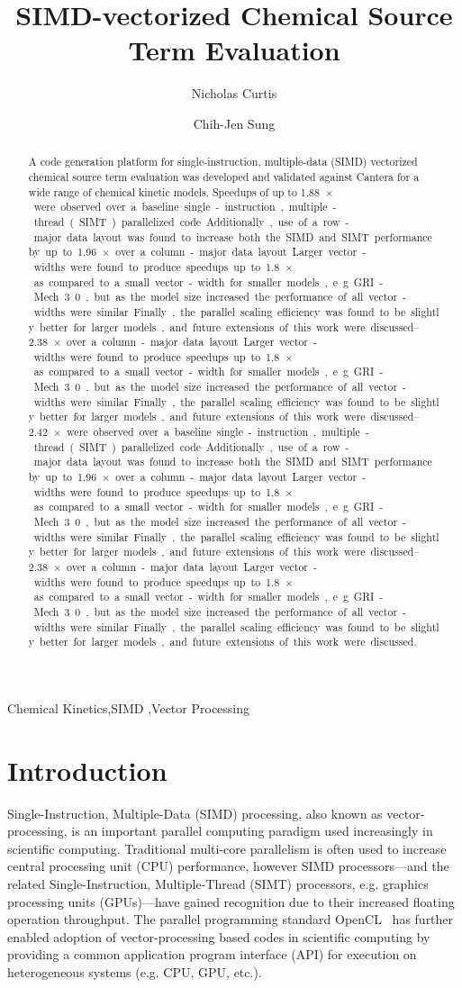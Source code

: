 \documentclass[12pt]{ussci}
\title{SIMD-vectorized Chemical Source Term Evaluation}
\author[*]{Nicholas Curtis}
\author[ ]{Chih-Jen Sung}
\affil[ ]{Department of Mechanical Engineering, University of Connecticut, Storrs, CT 06269, USA}
\affil[*]{Corresponding author: \email{nicholas.curtis@uconn.edu}}
\begin{document}
\maketitle

\begin{abstract} %
A code generation platform for single-instruction, multiple-data (SIMD) vectorized chemical source term evaluation was developed and validated against Cantera for a wide range of chemical kinetic models.
Speedups of up to \SIrange{1.88}{2.42}{$\times$} were observed over a baseline single-instruction, multiple-thread (SIMT) parallelized code.
Additionally, use of a row-major data layout was found to increase both the SIMD and SIMT performance by up to \SIrange{1.96}{2.38}{$\times$} over a column-major data layout.
Larger vector-widths were found to produce speedups up to \SI{1.8}{$\times$} as compared to a small vector-width for smaller models, e.g. GRI-Mech 3.0, but as the model size increased the performance of all vector-widths were similar.
Finally, the parallel scaling efficiency was found to be slightly better for larger models, and future extensions of this work were discussed.
\end{abstract}

\begin{keyword}
    Chemical Kinetics\sep SIMD \sep Vector Processing
\end{keyword}

\section{Introduction}
%

Single-Instruction, Multiple-Data (SIMD) processing, also known as vector-processing, is an important parallel computing paradigm used increasingly in scientific computing.
Traditional multi-core parallelism is often used to increase central processing unit (CPU) performance, however SIMD processors---and the related Single-Instruction, Multiple-Thread (SIMT) processors, e.g. graphics processing units (GPUs)---have gained recognition due to their increased floating operation throughput.
The parallel programming standard OpenCL~\cite{stone2010opencl} has further enabled adoption of vector-processing based codes in scientific computing by providing a common application program interface (API) for execution on heterogeneous systems (e.g. CPU, GPU, etc.).
\end{document}
